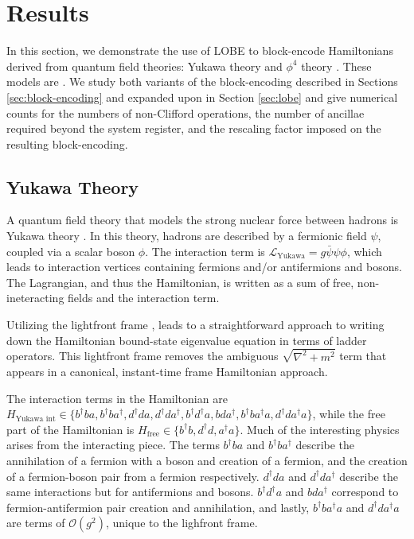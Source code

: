 \section{Results}
\label{sec:results}

In this section, we demonstrate the use of LOBE to block-encode Hamiltonians derived from quantum field theories: Yukawa theory and $\phi^4$ theory \cite{Peskin:1995ev}. These models are .
We study both variants of the block-encoding described in Sections \ref{sec:block-encoding} and expanded upon in Section \ref{sec:lobe} and give numerical counts for the numbers of non-Clifford operations, the number of ancillae required beyond the system register, and the rescaling factor imposed on the resulting block-encoding.

\subsection{Yukawa Theory}
A quantum field theory that models the strong nuclear force between hadrons is Yukawa theory \cite{Peskin:1995ev}. In this theory, hadrons are described by a fermionic field $\psi$, coupled via a scalar boson $\phi$. The interaction term is $\mathcal{L}_{\text{Yukawa}} = g\bar\psi \psi \phi$, which leads to interaction vertices containing fermions and/or antifermions and bosons. The Lagrangian, and thus the Hamiltonian, is written as a sum of free, non-ineteracting fields and the interaction term.

Utilizing the lightfront frame \cite{Dirac1949}, leads to a straightforward approach to writing down the Hamiltonian bound-state eigenvalue equation in terms of ladder operators. This lightfront frame removes the ambiguous $\sqrt{\nabla^2 + m^2}$ term that appears in a canonical, instant-time frame Hamiltonian approach. 

The interaction terms in the Hamiltonian are $H_{\text{Yukawa int}} \in \{b^\dagger b a, b^\dagger b a^\dagger, d^\dagger d a, d^\dagger d a^\dagger, b^\dagger d^\dagger a, bda^\dagger, b^\dagger b a^\dagger a, d^\dagger d a^\dagger a \}$, while the free part of the Hamiltonian is $H_{\text{free}} \in \{b^\dagger b, d^\dagger d, a^\dagger a \}$. 
Much of the interesting physics arises from the interacting piece. The terms $b^\dagger b a$ and $b^\dagger b a^\dagger$ describe the annihilation of a fermion with a boson and creation of a fermion, and the creation of a fermion-boson pair from a fermion respectively. $d^\dagger d a$ and $d^\dagger d a^\dagger$ describe the same interactions but for antifermions and bosons. 
$b^\dagger d^\dagger a$ and $bda^\dagger$ correspond to fermion-antifermion pair creation and annihilation, and lastly, $b^\dagger b a^\dagger a$ and $d^\dagger d a^\dagger a$ are terms of $\mathcal{O}(g^2)$, unique to the lighfront frame.


